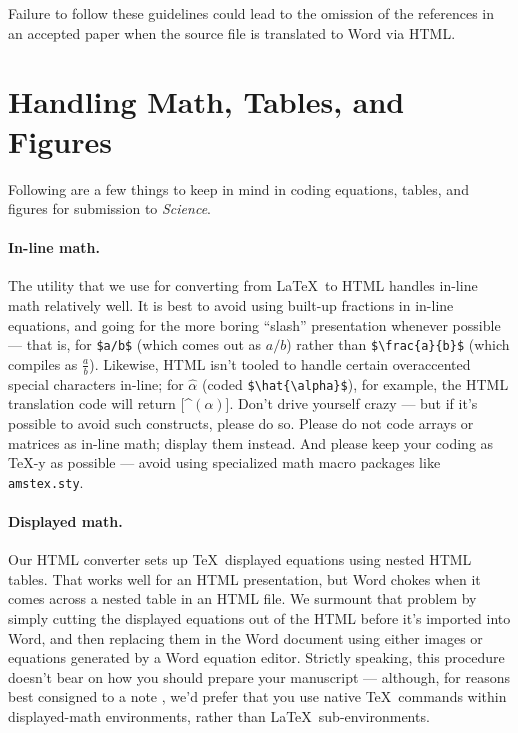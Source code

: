 \documentclass[12pt]{article}
\begin{document}
\noindent Failure to follow these guidelines could lead
to the omission of the references in an accepted paper when the source
file is translated to Word via HTML.

\section*{Handling Math, Tables, and Figures}

Following are a few things to keep in mind in coding equations,
tables, and figures for submission to {\it Science}.

\paragraph*{In-line math.}  The utility that we use for converting
from \LaTeX\ to HTML handles in-line math relatively well.  It is best
to avoid using built-up fractions in in-line equations, and going for
the more boring ``slash'' presentation whenever possible --- that is,
for \verb+$a/b$+ (which comes out as $a/b$) rather than
\verb+$\frac{a}{b}$+ (which compiles as $\frac{a}{b}$).  Likewise,
HTML isn't tooled to handle certain overaccented special characters
in-line; for $\hat{\alpha}$ (coded \verb+$\hat{\alpha}$+), for
example, the HTML translation code will return [\^{}$(\alpha)$].
Don't drive yourself crazy --- but if it's possible to avoid such
constructs, please do so.  Please do not code arrays or matrices as
in-line math; display them instead.  And please keep your coding as
\TeX-y as possible --- avoid using specialized math macro packages
like \texttt{amstex.sty}.

\paragraph*{Displayed math.} Our HTML converter sets up \TeX\
displayed equations using nested HTML tables.  That works well for an
HTML presentation, but Word chokes when it comes across a nested
table in an HTML file.  We surmount that problem by simply cutting the
displayed equations out of the HTML before it's imported into Word,
and then replacing them in the Word document using either images or
equations generated by a Word equation editor.  Strictly speaking,
this procedure doesn't bear on how you should prepare your manuscript
--- although, for reasons best consigned to a note \cite{nattex}, we'd
prefer that you use native \TeX\ commands within displayed-math
environments, rather than \LaTeX\ sub-environments.
\end{document}
